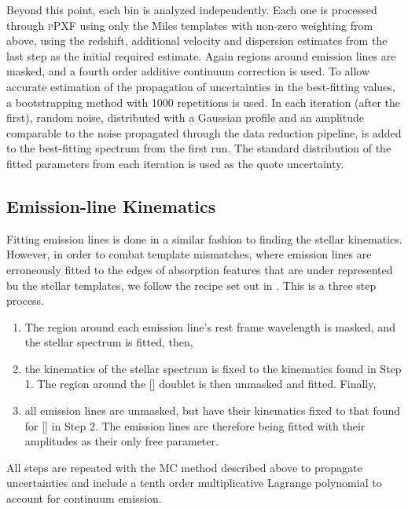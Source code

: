 		Beyond this point, each bin is analyzed independently. Each one is processed through \textsc{pPXF} using only the Miles templates with non-zero weighting from above, using the redshift, additional velocity and dispersion estimates from the last step as the initial required estimate. Again regions around emission lines are masked, and a fourth order additive continuum correction is used. To allow accurate estimation of the propagation of uncertainties in the best-fitting values, a bootstrapping method with 1000 repetitions is used. In each iteration (after the first), random noise, distributed with a Gaussian profile and an amplitude comparable to the noise propagated through the data reduction pipeline, is added to the best-fitting spectrum from the first run. The standard distribution of the fitted parameters from each iteration is used as the quote uncertainty.


	\subsection{Emission-line Kinematics}
		\label{subsec:EmissionFit}
		Fitting emission lines is done in a similar fashion to finding the stellar kinematics. However, in order to combat template mismatches, where emission lines are erroneously fitted to the edges of absorption features that are under represented bu the stellar templates, we follow the recipe set out in \citet{Sarzi2005}. This is a three step process.
		\begin{enumerate}
			\item The region around each emission line's rest frame wavelength is masked, and the stellar spectrum is fitted, then,
			\item the kinematics of the stellar spectrum is fixed to the kinematics found in Step 1. The region around the [] doublet is then unmasked and fitted. Finally, 
			\item all emission lines are unmasked, but have their kinematics fixed to that found for [] in Step 2. The emission lines are therefore being fitted with their amplitudes as their only free parameter. 
		\end{enumerate}
		All steps are repeated with the MC method described above to propagate uncertainties and include a tenth order multiplicative Lagrange polynomial to account for continuum emission. 

